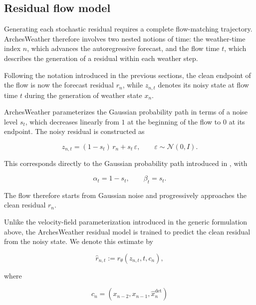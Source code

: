 \subsection{Residual flow model}

Generating each stochastic residual requires a complete flow-matching
trajectory.
ArchesWeather therefore involves two nested notions of time: the weather-time
index $n$, which advances the autoregressive forecast, and the flow time
$t$, which describes the generation of a residual within each weather step.

Following the notation introduced in the previous sections, the clean endpoint
of the flow is now the forecast residual $r_n$, while $z_{n,t}$ denotes its
noisy state at flow time $t$ during the generation of weather state $x_n$.

ArchesWeather parameterizes the Gaussian probability path in terms of a noise
level $s_t$, which decreases linearly from $1$ at the beginning of the flow
to $0$ at its endpoint.
The noisy residual is constructed as

\begin{equation}
    z_{n,t}
    =
    (1-s_t)\,r_n
    +
    s_t\,\varepsilon,
    \qquad
    \varepsilon\sim\mathcal{N}(0,I).
    \label{eq:arches-probability-path}
\end{equation}

This corresponds directly to the Gaussian probability path introduced in
, with

\begin{equation}
    \alpha_t = 1-s_t,
    \qquad
    \beta_t = s_t.
    \label{eq:arches-path-mapping}
\end{equation}

The flow therefore starts from Gaussian noise and progressively approaches the
clean residual $r_n$.

Unlike the velocity-field parameterization introduced in the generic
formulation above, the ArchesWeather residual model is trained to predict the
clean residual from the noisy state.
We denote this estimate by

\begin{equation}
    \hat{r}_{n,t}
    :=
    r_\theta(z_{n,t},t,c_n),
    \label{eq:arches-clean-residual}
\end{equation}

where

\[
    c_n
    =
    \left(
        x_{n-2},
        x_{n-1},
        \hat{x}^{\mathrm{det}}_n
    \right)
\]

